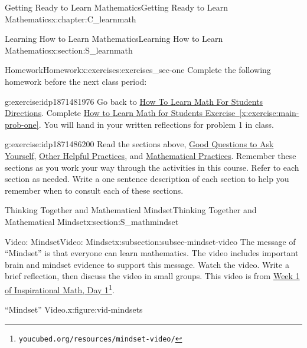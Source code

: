 \documentclass[oneside,10pt,]{book}
\newcommand{\xreffont}{\relax}
\numberwithin{equation}{chapter}
\newlength{\qrsize}
\newlength{\previewwidth}
\begin{document}
\begin{chapterptx}{Getting Ready to Learn Mathematics}{}{Getting Ready to Learn Mathematics}{}{}{x:chapter:C_learnmath}
\begin{sectionptx}{Learning How to Learn Mathematics}{}{Learning How to Learn Mathematics}{}{}{x:section:S_learnmath}
\begin{exercises-subsection}{Homework}{}{Homework}{}{}{x:exercises:exercises_sec-one}
Complete the following homework before the next class period:%
\begin{divisionexercise}{1}{}{}{g:exercise:idp1871481976}%
Go back to \hyperlink{x:paragraphs:htlmfs-directions}{How To Learn Math For Students Directions}. Complete \hyperref[x:exercise:main-prob-one]{How to Learn Math for Students Exercise~{\xreffont\ref{x:exercise:main-prob-one}}}. You will hand in your written reflections for problem 1 in class.%
\end{divisionexercise}%
\begin{divisionexercise}{2}{}{}{g:exercise:idp1871486200}%
Read the sections above, \hyperref[x:subsection:subsec-good-questions]{Good Questions to Ask Yourself}, \hyperref[x:subsection:subsec-practices]{Other Helpful Practices}, and \hyperref[x:subsection:subsec-math-practices]{Mathematical Practices}. Remember these sections as you work your way through the activities in this course. Refer to each section as needed. Write a one sentence description of each section to help you remember when to consult each of these sections.%
\end{divisionexercise}%
\end{exercises-subsection}
\end{sectionptx}
%
%
\typeout{************************************************}
\typeout{************************************************}
%
\begin{sectionptx}{Thinking Together and Mathematical Mindset}{}{Thinking Together and Mathematical Mindset}{}{}{x:section:S_mathmindset}
%
%
\typeout{************************************************}
\typeout{************************************************}
%
\begin{subsectionptx}{Video: Mindset}{}{Video: Mindset}{}{}{x:subsection:subsec-mindset-video}
The message of ``Mindset'' is that everyone can learn mathematics. The video includes important brain and mindset evidence to support this message. Watch the video. Write a brief reflection, then discuss the video in small groups. This video is from \href{https://www.youcubed.org/resources/mindset-video/}{Week 1 of Inspirational Math, Day 1}\footnote{\nolinkurl{youcubed.org/resources/mindset-video/}\label{g:fn:idp1871490680}}.%
\begin{figureptx}{``Mindset'' Video.}{x:figure:vid-mindsets}{}%
\centering
\setlength{\qrsize}{9em}
\setlength{\previewwidth}{\linewidth}
\addtolength{\previewwidth}{-\qrsize}
\begin{tcbraster}[raster columns=2, raster column skip=1pt, raster halign=center, raster force size=false, raster left skip=0pt, raster right skip=0pt]%

\end{tcbraster}
\end{figureptx}
\end{subsectionptx}
\end{sectionptx}
\end{chapterptx}
\end{document}
